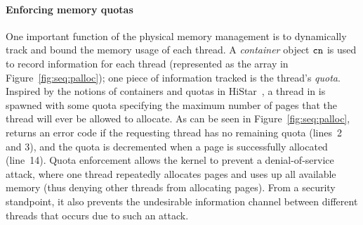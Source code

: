 
\paragraph{Enforcing memory quotas}
One important function of the physical memory management is to dynamically
track and bound the memory usage of each thread. A \emph{container}
object ${\texttt{cn}}$ is used to record information for each thread (represented as the array 
in Figure~\ref{fig:seq:palloc}); one piece of information tracked is the
thread's \emph{quota}. Inspired by the notions of containers and
quotas in HiStar~\cite{zeldovich06}, a thread
in {\mCTOS} is spawned with some quota specifying the maximum number
of pages that the thread will ever be allowed to allocate. As can be
seen in Figure~\ref{fig:seq:palloc},  returns an error
code if the requesting thread has no remaining quota (lines~2 and 3), 
and the quota is decremented when a page is successfully allocated (line~14).
Quota enforcement allows the kernel to prevent a denial-of-service attack,
where one thread repeatedly allocates pages and uses up all available
memory (thus denying other threads from allocating pages). From a security
standpoint, it also prevents the undesirable information channel between 
different threads that occurs due to such an attack.

